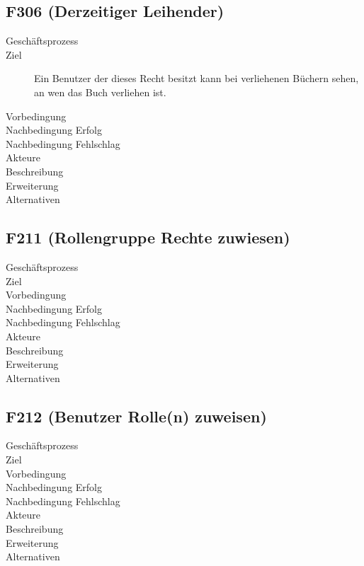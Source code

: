 \subsection{F306 (Derzeitiger Leihender)}
\begin{description}
  \item[Geschäftsprozess]
  \item[Ziel]Ein Benutzer der dieses Recht besitzt kann bei verliehenen Büchern sehen, an wen das Buch verliehen ist.
  \item[Vorbedingung]
  \item[Nachbedingung Erfolg]
  \item[Nachbedingung Fehlschlag]
  \item[Akteure]
  \item[Beschreibung]
  \item[Erweiterung]
  \item[Alternativen]
\end{description}

\subsection{F211 (Rollengruppe Rechte zuwiesen)} 
\begin{description}
  \item[Geschäftsprozess]
  \item[Ziel]
  \item[Vorbedingung]
  \item[Nachbedingung Erfolg]
  \item[Nachbedingung Fehlschlag]
  \item[Akteure]
  \item[Beschreibung]
  \item[Erweiterung]
  \item[Alternativen]
\end{description}

\subsection{F212 (Benutzer Rolle(n) zuweisen)}
\begin{description}
  \item[Geschäftsprozess]
  \item[Ziel]
  \item[Vorbedingung]
  \item[Nachbedingung Erfolg]
  \item[Nachbedingung Fehlschlag]
  \item[Akteure]
  \item[Beschreibung]
  \item[Erweiterung]
  \item[Alternativen]
\end{description}
